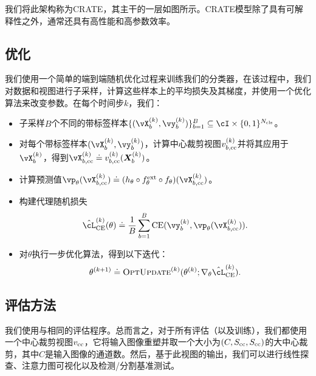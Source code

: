 \documentclass[../../book-main_zh.tex]{subfiles}
\begin{document}
我们将此架构称为CRATE，其主干的一层如图所示。CRATE模型除了具有可解释性之外，通常还具有高性能和高参数效率。

\subsection{优化} \label{sub:image_classification_optimization}

我们使用一个简单的端到端随机优化过程来训练我们的分类器，在该过程中，我们对数据和视图进行子采样，计算这些样本上的平均损失及其梯度，并使用一个优化算法来改变参数。在每个时间步\(k\)，我们：
\begin{itemize}
    \item 子采样\(B\)个不同的带标签样本\(\{(\vX_{b}^{(k)}, \vy_{b}^{(k)})\}_{b = 1}^{B} \subseteq \cI \times \{0, 1\}^{N_{\cls}}\)。
    \item 对每个带标签样本\((\vX_{b}^{(k)}, \vy_{b}^{(k)})\)，计算中心裁剪视图\(v_{b, \mathrm{cc}}^{(k)}\)并将其应用于\(\vX_{b}^{(k)}\)，得到\(\vX_{b, \cc}^{(k)} \doteq v_{b, \cc}^{(k)}(\X_{b}^{(k)})\)。
    \item 计算预测值\(\vp_{\theta}(\vX_{b, \cc}^{(k)}) \doteq (h_{\theta} \circ f_{\theta}^{\ext} \circ f_{\theta})(\vX_{b, \cc}^{(k)})\)。
    \item 构建代理随机损失
    \begin{equation}
        \hat{\cL}_{\CE}^{(k)}(\theta) \doteq \frac{1}{B}\sum_{b = 1}^{B}\CE(\vy_{b}^{(k)}, \vp_{\theta}(\vX_{b, \cc}^{(k)})).
    \end{equation}
    \item 对\(\theta\)执行一步优化算法，得到以下迭代：
    \begin{equation}
        \theta^{(k + 1)} \doteq \textsc{OptUpdate}^{(k)}(\theta^{(k)}; \nabla_{\theta}\hat{\cL}_{\CE}^{(k)}).
    \end{equation}
\end{itemize}


\subsection{评估方法} \label{sub:image_classification_evals}

我们使用与相同的评估程序。总而言之，对于所有评估（以及训练），我们都使用一个中心裁剪视图\(v_{\mathrm{cc}}\)，它将输入图像重塑并取一个大小为\((C, S_{\mathrm{cc}}, S_{\mathrm{cc}})\)的大中心裁剪，其中\(C\)是输入图像的通道数。然后，基于此视图的输出，我们可以进行线性探查、注意力图可视化以及检测/分割基准测试。
\end{document}
